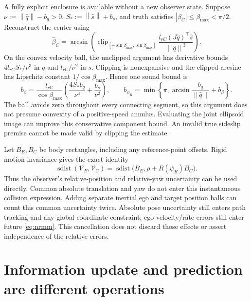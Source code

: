 \documentclass[10pt,letterpaper]{article}
\newcommand{\norm}[1]{\left\lVert#1\right\rVert}
\newcommand{\dist}{\operatorname{sdist}}
\begin{document}
A fully explicit enclosure is available without a new observer state. Suppose
$\nu:=\norm{\hat q}-b_q>0$, $S_*:=\norm{\hat s}+b_s$, and truth satisfies
$|\beta_C|\le\beta_{\max}<\pi/2$. Reconstruct the center using
\begin{equation}
\hat\beta_C=\arcsin\!\left(\operatorname{clip}_{[-\sin\beta_{\max},\sin\beta_{\max}]}
\frac{l_{rC}(J\hat q)^\top\hat s}{\norm{\hat q}^3}\right).
\end{equation}
On the convex velocity ball, the unclipped argument has derivative bounds
$4l_{rC}S_*/\nu^3$ in $q$ and $l_{rC}/\nu^2$ in $s$. Clipping is
nonexpansive and the clipped arcsine has Lipschitz constant
$1/\cos\beta_{\max}$. Hence one sound bound is
\begin{equation}\label{eq:explicitYawBound}
b_\beta=\frac{l_{rC}}{\cos\beta_{\max}}
\left(\frac{4S_*b_q}{\nu^3}+\frac{b_s}{\nu^2}\right),\qquad
b_{\psi_R}=\min\!\left\{\pi,\arcsin\frac{b_q}{\norm{\hat q}}+b_\beta\right\}.
\end{equation}
The ball avoids zero throughout every connecting segment, so this argument
does not presume convexity of a positive-speed annulus. Evaluating the joint
ellipsoid image can improve this conservative component bound. An invalid
true sideslip premise cannot be made valid by clipping the estimate.

Let $B_E,B_C$ be body rectangles, including any reference-point offsets. Rigid
motion invariance gives the exact identity
\begin{equation}\label{eq:relativeDistance}
\dist(\mathcal V_E,\mathcal V_C)
=\dist\bigl(B_E,\rho+R(\psi_R)B_C\bigr).
\end{equation}
Thus the observer's relative-position and relative-yaw uncertainty can be used
directly. Common absolute translation and yaw do not enter this instantaneous
collision expression. Adding separate inertial ego and target position balls
can count this common uncertainty twice. Absolute pose uncertainty still enters
path tracking and any global-coordinate constraint; ego velocity/rate errors
still enter future \eqref{eq:nrmm}. This cancellation does not discard those
effects or assert independence of the relative errors.

\section{Information update and prediction are different operations}
\end{document}
